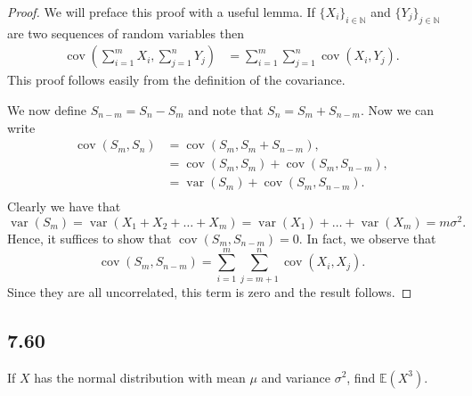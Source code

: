 \documentclass{article}
\newcommand{\N}{\mathbb{N}}
\newcommand{\E}[1]{\mathbb{E}(#1)}
\DeclareMathOperator{\cov}{cov}
\DeclareMathOperator{\var}{var}
\begin{document}
\begin{proof}
    We will preface this proof with a useful lemma. If $\{X_i\}_{i\in\N}$
    and $\{Y_j\}_{j\in\N}$ are two sequences of random variables then
    \begin{align*}
        \cov\left(\sum_{i=1}^m X_i, \sum_{j=1}^n Y_j\right) & =
        \sum_{i=1}^m\sum_{j=1}^n \cov(X_i, Y_j).
    \end{align*}
    This proof follows easily from the definition of the covariance.

    We now define $S_{n-m} = S_n - S_m$ and note that
    $S_n = S_m + S_{n-m}$. Now we can write
    \begin{align*}
        \cov(S_m, S_n) & = \cov(S_m, S_m + S_{n-m}),            \\
                       & = \cov(S_m, S_m) + \cov(S_m, S_{n-m}), \\
                       & = \var(S_m) + \cov(S_m, S_{n-m}).      \\
    \end{align*}
    Clearly we have that
    \begin{equation*}
        \var(S_m)=\var(X_1 + X_2 + \dots + X_m)
        = \var(X_1) + \dots + \var(X_m) = m\sigma^2.
    \end{equation*}
    Hence, it suffices to show that $\cov(S_m, S_{n-m}) = 0$. In fact, we
    observe that
    \begin{equation*}
        \cov(S_m, S_{n-m}) = \sum_{i=1}^m\sum_{j=m+1}^n \cov(X_i, X_j).
    \end{equation*}
    Since they are all uncorrelated, this term is zero and the result follows.
\end{proof}

\subsection*{7.60}
If $X$ has the normal distribution with mean $\mu$ and variance $\sigma^2$,
find $\E{X^3}$.
\end{document}
